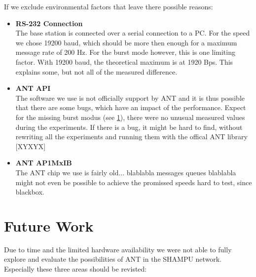If we exclude environmental factors that leave there possible reasons:
\begin{itemize}
	\item{\textbf{RS-232 Connection}} \hfill \\ The base station is connected over a serial connection to a PC. For the speed we chose 19200 baud, which should be more then enough for a maximum message rate of 200 Hz. For the burst mode however, this is one limiting factor. With 19200 baud, the theoretical maximum is at 1920 Bps. This explains some, but not all of the measured difference.
	\item{\textbf{ANT API}} \hfill \\ The software we use is not officially support by ANT and it is thus possible that there are some bugs, which have an impact of the performance. Expect for the missing burst modus (see \ref{sec:future}), there were no unusual measured values during the experiments. If there is a bug, it might be hard to find, without rewriting all the experiments and running them with the offical ANT library [XYXYX]
	\item{\textbf{ANT AP1MxIB}} \hfill \\ The ANT chip we use is fairly old... blablabla  messages queues blablabla might not even be possible to achieve the promissed speeds hard to test, since blackbox.
\end{itemize}
\newpage
\section{Future Work}
\label{sec:future}
Due to time and the limited hardware availability we were not able to fully explore and evaluate the possibilities of ANT in the SHAMPU network. Especially these three areas should be revisted:

